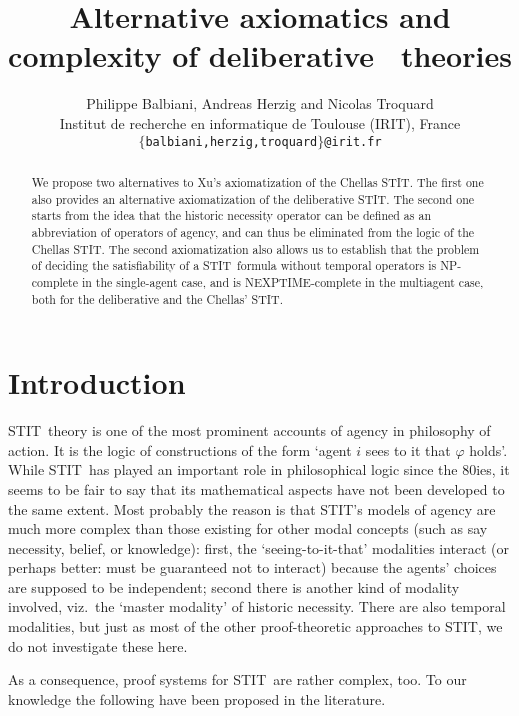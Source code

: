 \documentclass{article}
\title{Alternative axiomatics and complexity of deliberative \STIT\ theories}
\author{Philippe Balbiani, Andreas Herzig and Nicolas Troquard
\\ Institut de recherche en informatique de Toulouse (IRIT), France
\\ \small{\texttt{$\{$balbiani,herzig,troquard$\}$@irit.fr}}
}
\date{}
\renewcommand{\phi}{\varphi}
\newcommand{\STIT} {{\textsf{STIT}}}              \newcommand{\CSTIT}{{\textsf{CSTIT}}}            \newcommand{\DSTIT}{{\textsf{DSTIT}}}
\begin{document}
\maketitle

\begin{abstract}
We propose two alternatives to Xu's axiomatization of the Chellas \STIT.
The first one also provides an alternative axiomatization of
the deliberative \STIT.
The second one starts from the idea that the historic necessity operator
can be defined as an abbreviation of operators of agency, and
can thus be eliminated from the logic of the Chellas \STIT.
The second axiomatization also allows us to establish
that the problem of deciding the satisfiability of a \STIT\ formula
without temporal operators is NP-complete in the single-agent case, and
is NEXPTIME-complete in the multiagent case, both for the deliberative
and the Chellas' \STIT.
\end{abstract}

\tableofcontents

\section{Introduction}


\STIT\ theory is one of the most prominent accounts of agency in
philosophy of action. It is the logic of constructions of the form
`agent $i$ sees to it that $\phi$ holds'.
While \STIT\ has played an important role in philosophical logic
since the 80ies, it seems to be fair to say that its mathematical aspects
have not been developed to the same extent. Most probably the reason is that
\STIT's models of agency are much more complex than
those existing for other modal concepts (such as say necessity, belief,
or knowledge): first, the `seeing-to-it-that' modalities interact
(or perhaps better: must be guaranteed not to interact)
because the agents' choices are supposed to be independent;
second there is another kind of modality involved, viz.\
the `master modality' of historic necessity.
There are also temporal modalities, but just as most of the other
proof-theoretic approaches to \STIT, we do not investigate
these here.

As a consequence, proof systems for \STIT\ are rather complex, too.
To our knowledge the following have been proposed in the literature.
\end{document}

